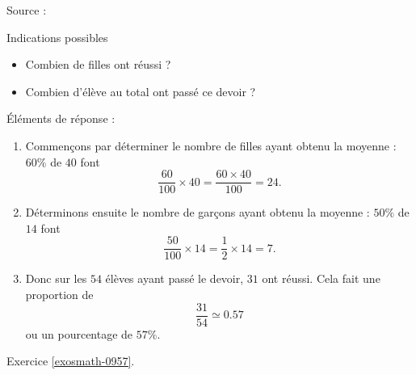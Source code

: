 

Source : \cite{NRHooXFvgpp4}

Indications possibles
\begin{itemize}
    \item Combien de filles ont réussi ?
    \item Combien d'élève au total ont passé ce devoir ?
\end{itemize}

Éléments de réponse :
\begin{enumerate}
    \item
        Commençons par déterminer le nombre de filles ayant obtenu la moyenne : \( 60\%\) de \( 40\) font
        \begin{equation}
            \frac{ 60 }{ 100 }\times 40=\frac{ 60\times 40 }{ 100 }=24.
        \end{equation}
    \item
        Déterminons ensuite le nombre de garçons ayant obtenu la moyenne : \( 50\%\) de \( 14\) font
        \begin{equation}
            \frac{ 50 }{ 100 }\times 14=\frac{ 1 }{2}\times 14=7.
        \end{equation}
    \item
        Donc sur les \( 54\) élèves ayant passé le devoir, \( 31\) ont réussi. Cela fait une proportion de
        \begin{equation}
            \frac{ 31 }{ 54 }\simeq 0.57
        \end{equation}
        ou un pourcentage de \( 57\%\).
\end{enumerate}

Exercice \ref{exosmath-0957}.
